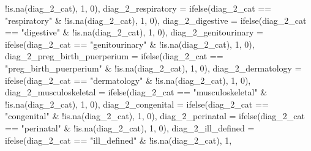 \documentclass[
]{article}
\newenvironment{Shaded}{\begin{snugshade}}{\end{snugshade}}
\newcommand{\AttributeTok}[1]{\textcolor[rgb]{0.77,0.63,0.00}{#1}}
\newcommand{\DecValTok}[1]{\textcolor[rgb]{0.00,0.00,0.81}{#1}}
\newcommand{\FunctionTok}[1]{\textcolor[rgb]{0.00,0.00,0.00}{#1}}
\newcommand{\NormalTok}[1]{#1}
\newcommand{\SpecialCharTok}[1]{\textcolor[rgb]{0.00,0.00,0.00}{#1}}
\newcommand{\StringTok}[1]{\textcolor[rgb]{0.31,0.60,0.02}{#1}}
\begin{document}
\begin{Shaded}
\begin{Highlighting}[]
            \SpecialCharTok{!}\FunctionTok{is.na}\NormalTok{(diag\_2\_cat), }\DecValTok{1}\NormalTok{, }\DecValTok{0}\NormalTok{), }\AttributeTok{diag\_2\_respiratory =} \FunctionTok{ifelse}\NormalTok{(diag\_2\_cat }\SpecialCharTok{==}
            \StringTok{"respiratory"} \SpecialCharTok{\&} \SpecialCharTok{!}\FunctionTok{is.na}\NormalTok{(diag\_2\_cat), }\DecValTok{1}\NormalTok{,}
            \DecValTok{0}\NormalTok{), }\AttributeTok{diag\_2\_digestive =} \FunctionTok{ifelse}\NormalTok{(diag\_2\_cat }\SpecialCharTok{==}
            \StringTok{"digestive"} \SpecialCharTok{\&} \SpecialCharTok{!}\FunctionTok{is.na}\NormalTok{(diag\_2\_cat), }\DecValTok{1}\NormalTok{, }\DecValTok{0}\NormalTok{),}
        \AttributeTok{diag\_2\_genitourinary =} \FunctionTok{ifelse}\NormalTok{(diag\_2\_cat }\SpecialCharTok{==}
            \StringTok{"genitourinary"} \SpecialCharTok{\&} \SpecialCharTok{!}\FunctionTok{is.na}\NormalTok{(diag\_2\_cat), }\DecValTok{1}\NormalTok{,}
            \DecValTok{0}\NormalTok{), }\AttributeTok{diag\_2\_preg\_birth\_puerperium =} \FunctionTok{ifelse}\NormalTok{(diag\_2\_cat }\SpecialCharTok{==}
            \StringTok{"preg\_birth\_puerperium"} \SpecialCharTok{\&} \SpecialCharTok{!}\FunctionTok{is.na}\NormalTok{(diag\_2\_cat),}
            \DecValTok{1}\NormalTok{, }\DecValTok{0}\NormalTok{), }\AttributeTok{diag\_2\_dermatology =} \FunctionTok{ifelse}\NormalTok{(diag\_2\_cat }\SpecialCharTok{==}
            \StringTok{"dermatology"} \SpecialCharTok{\&} \SpecialCharTok{!}\FunctionTok{is.na}\NormalTok{(diag\_2\_cat), }\DecValTok{1}\NormalTok{,}
            \DecValTok{0}\NormalTok{), }\AttributeTok{diag\_2\_musculoskeletal =} \FunctionTok{ifelse}\NormalTok{(diag\_2\_cat }\SpecialCharTok{==}
            \StringTok{"musculoskeletal"} \SpecialCharTok{\&} \SpecialCharTok{!}\FunctionTok{is.na}\NormalTok{(diag\_2\_cat),}
            \DecValTok{1}\NormalTok{, }\DecValTok{0}\NormalTok{), }\AttributeTok{diag\_2\_congenital =} \FunctionTok{ifelse}\NormalTok{(diag\_2\_cat }\SpecialCharTok{==}
            \StringTok{"congenital"} \SpecialCharTok{\&} \SpecialCharTok{!}\FunctionTok{is.na}\NormalTok{(diag\_2\_cat), }\DecValTok{1}\NormalTok{, }\DecValTok{0}\NormalTok{),}
        \AttributeTok{diag\_2\_perinatal =} \FunctionTok{ifelse}\NormalTok{(diag\_2\_cat }\SpecialCharTok{==} \StringTok{"perinatal"} \SpecialCharTok{\&}
            \SpecialCharTok{!}\FunctionTok{is.na}\NormalTok{(diag\_2\_cat), }\DecValTok{1}\NormalTok{, }\DecValTok{0}\NormalTok{), }\AttributeTok{diag\_2\_ill\_defined =} \FunctionTok{ifelse}\NormalTok{(diag\_2\_cat }\SpecialCharTok{==}
            \StringTok{"ill\_defined"} \SpecialCharTok{\&} \SpecialCharTok{!}\FunctionTok{is.na}\NormalTok{(diag\_2\_cat), }\DecValTok{1}\NormalTok{,}

\end{Highlighting}
\end{Shaded}
\end{document}
